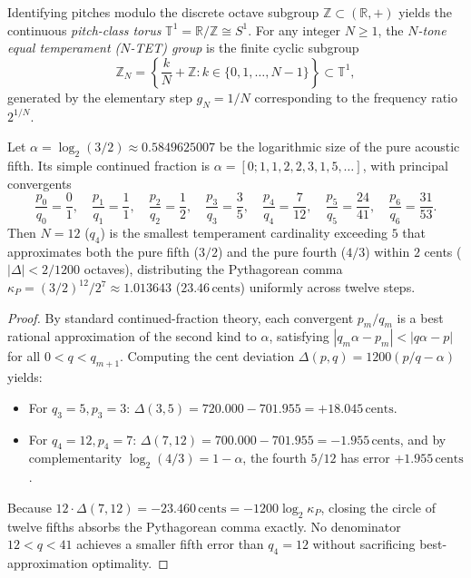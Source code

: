\begin{definition}
Identifying pitches modulo the discrete octave subgroup $\mathbb{Z} \subset (\mathbb{R}, +)$ yields the continuous \emph{pitch-class torus} $\mathbb{T}^1 = \mathbb{R}/\mathbb{Z} \cong S^1$. For any integer $N \ge 1$, the \emph{$N$-tone equal temperament ($N$-TET) group} is the finite cyclic subgroup
\begin{equation}
\mathbb{Z}_N = \left\{ \frac{k}{N} + \mathbb{Z} : k \in \{0, 1, \dots, N-1\} \right\} \subset \mathbb{T}^1,
\end{equation}
generated by the elementary step $g_N = 1/N$ corresponding to the frequency ratio $2^{1/N}$.
\end{definition}

\begin{theorem}
\label{thm:12tet-opt}
Let $\alpha = \log_2(3/2) \approx 0.5849625007$ be the logarithmic size of the pure acoustic fifth. Its simple continued fraction is $\alpha = [0; 1, 1, 2, 2, 3, 1, 5, \dots]$, with principal convergents
\[
\frac{p_0}{q_0} = \frac{0}{1},\quad \frac{p_1}{q_1} = \frac{1}{1},\quad \frac{p_2}{q_2} = \frac{1}{2},\quad \frac{p_3}{q_3} = \frac{3}{5},\quad \frac{p_4}{q_4} = \frac{7}{12},\quad \frac{p_5}{q_5} = \frac{24}{41},\quad \frac{p_6}{q_6} = \frac{31}{53}.
\]
Then $N = 12$ ($q_4$) is the smallest temperament cardinality exceeding $5$ that approximates both the pure fifth ($3/2$) and the pure fourth ($4/3$) within $2$ cents ($|\Delta| < 2/1200$ octaves), distributing the Pythagorean comma $\kappa_P = (3/2)^{12}/2^7 \approx 1.013643$ ($23.46\,\text{cents}$) uniformly across twelve steps.
\end{theorem}

\begin{proof}
By standard continued-fraction theory, each convergent $p_m / q_m$ is a best rational approximation of the second kind to $\alpha$, satisfying $|q_m \alpha - p_m| < |q \alpha - p|$ for all $0 < q < q_{m+1}$. Computing the cent deviation $\Delta(p, q) = 1200(p/q - \alpha)$ yields:
\begin{itemize}[leftmargin=1.5em]
  \item For $q_3 = 5, p_3 = 3$: $\Delta(3, 5) = 720.000 - 701.955 = +18.045\,\text{cents}$.
  \item For $q_4 = 12, p_4 = 7$: $\Delta(7, 12) = 700.000 - 701.955 = -1.955\,\text{cents}$, and by complementarity $\log_2(4/3) = 1 - \alpha$, the fourth $5/12$ has error $+1.955\,\text{cents}$.
\end{itemize}
Because $12 \cdot \Delta(7, 12) = -23.460\,\text{cents} = -1200\log_2 \kappa_P$, closing the circle of twelve fifths absorbs the Pythagorean comma exactly. No denominator $12 < q < 41$ achieves a smaller fifth error than $q_4 = 12$ without sacrificing best-approximation optimality.
\end{proof}

